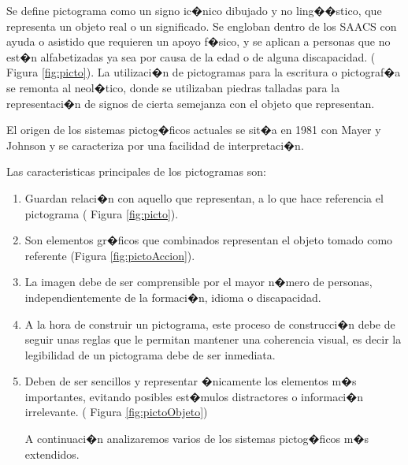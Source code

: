 Se define pictograma como un signo ic�nico dibujado y no ling��stico, que representa un objeto real o un significado.
Se engloban dentro de los SAACS con ayuda o asistido que requieren un apoyo f�sico, y se aplican a personas que no est�n alfabetizadas ya sea por causa de la edad o de alguna discapacidad. ( Figura \ref{fig:picto}). 
La utilizaci�n de pictogramas para la escritura o pictograf�a se remonta al neol�tico, donde se utilizaban piedras talladas para la representaci�n de signos de cierta semejanza con el objeto que representan. 


El origen de los sistemas pictog�ficos actuales se sit�a en 1981 con Mayer y Johnson y se caracteriza por una facilidad de interpretaci�n. 

Las caracteristicas principales de los pictogramas son:
 \begin{enumerate}

 \item Guardan relaci�n con aquello que representan, a lo que hace referencia el pictograma ( Figura \ref{fig:picto}).

 \item Son elementos gr�ficos que combinados representan el objeto tomado como referente (Figura \ref{fig:pictoAccion}).
 

 \item La imagen debe de ser comprensible por el mayor n�mero de personas, independientemente de la formaci�n, idioma o discapacidad. 
 

 \item A la hora de construir un pictograma, este proceso de construcci�n debe de seguir unas reglas que le permitan mantener una coherencia visual, es decir la legibilidad de un pictograma debe de ser inmediata.  

\item Deben de ser sencillos y representar �nicamente los elementos m�s importantes, evitando posibles est�mulos distractores o informaci�n irrelevante. ( Figura \ref{fig:pictoObjeto})

A continuaci�n analizaremos varios de los sistemas pictog�ficos m�s extendidos.

\end{enumerate}

